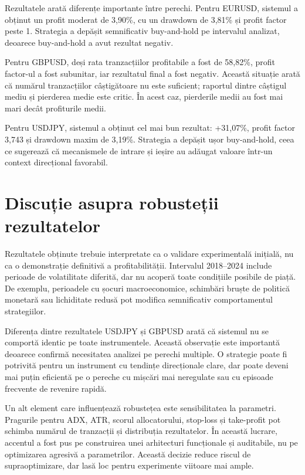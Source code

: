 Rezultatele arată diferențe importante între perechi. Pentru EURUSD, sistemul a obținut un profit moderat de 3,90\%, cu un drawdown de 3,81\% și profit factor peste 1. Strategia a depășit semnificativ buy-and-hold pe intervalul analizat, deoarece buy-and-hold a avut rezultat negativ.

Pentru GBPUSD, deși rata tranzacțiilor profitabile a fost de 58,82\%, profit factor-ul a fost subunitar, iar rezultatul final a fost negativ. Această situație arată că numărul tranzacțiilor câștigătoare nu este suficient; raportul dintre câștigul mediu și pierderea medie este critic. În acest caz, pierderile medii au fost mai mari decât profiturile medii.

Pentru USDJPY, sistemul a obținut cel mai bun rezultat: +31,07\%, profit factor 3,743 și drawdown maxim de 3,19\%. Strategia a depășit ușor buy-and-hold, ceea ce sugerează că mecanismele de intrare și ieșire au adăugat valoare într-un context direcțional favorabil.

\section{Discuție asupra robusteții rezultatelor}
\label{cap:cap4:robustete}

Rezultatele obținute trebuie interpretate ca o validare experimentală inițială, nu ca o demonstrație definitivă a profitabilității. Intervalul 2018--2024 include perioade de volatilitate diferită, dar nu acoperă toate condițiile posibile de piață. De exemplu, perioadele cu șocuri macroeconomice, schimbări bruște de politică monetară sau lichiditate redusă pot modifica semnificativ comportamentul strategiilor.

Diferența dintre rezultatele USDJPY și GBPUSD arată că sistemul nu se comportă identic pe toate instrumentele. Această observație este importantă deoarece confirmă necesitatea analizei pe perechi multiple. O strategie poate fi potrivită pentru un instrument cu tendințe direcționale clare, dar poate deveni mai puțin eficientă pe o pereche cu mișcări mai neregulate sau cu episoade frecvente de revenire rapidă.

Un alt element care influențează robustețea este sensibilitatea la parametri. Pragurile pentru ADX, ATR, scorul allocatorului, stop-loss și take-profit pot schimba numărul de tranzacții și distribuția rezultatelor. În această lucrare, accentul a fost pus pe construirea unei arhitecturi funcționale și auditabile, nu pe optimizarea agresivă a parametrilor. Această decizie reduce riscul de supraoptimizare, dar lasă loc pentru experimente viitoare mai ample.

